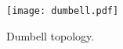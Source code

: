 \documentclass[conference]{IEEEtran}
\begin{document}





\begin{figure}[!t]
\centering
\texttt{[image: dumbell.pdf]}
\caption{Dumbell topology.}
\label{fig_sim}
\end{figure}
\end{document}
